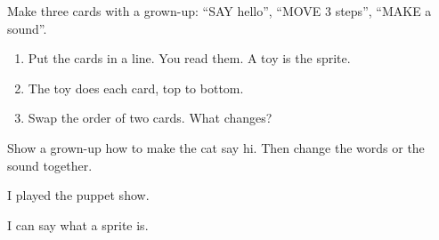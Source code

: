 
\begin{playathome}
Make three cards with a grown-up: \enquote{SAY hello}, \enquote{MOVE 3 steps}, \enquote{MAKE a sound}.
\begin{enumerate}[leftmargin=1.4em,itemsep=2pt]
  \item Put the cards in a line. You read them. A toy is the sprite.
  \item The toy does each card, top to bottom.
  \item Swap the order of two cards. What changes?
\end{enumerate}
\end{playathome}

\begin{playathome}
Show a grown-up how to make the cat say hi. Then change the words or the sound together.
\end{playathome}

\begin{selfcheck}
  \item I played the puppet show.
  \item I can say what a sprite is.
\end{selfcheck}
